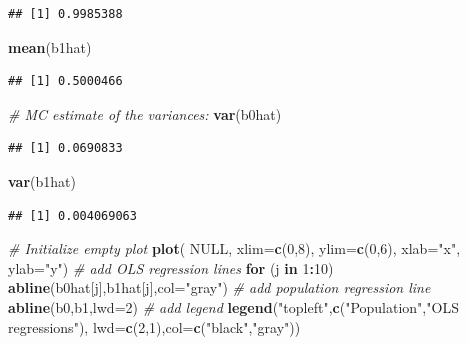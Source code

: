 \documentclass[]{book}
\newenvironment{Shaded}{\begin{snugshade}}{\end{snugshade}}
\newcommand{\CommentTok}[1]{\textcolor[rgb]{0.56,0.35,0.01}{\textit{#1}}}
\newcommand{\ControlFlowTok}[1]{\textcolor[rgb]{0.13,0.29,0.53}{\textbf{#1}}}
\newcommand{\DataTypeTok}[1]{\textcolor[rgb]{0.13,0.29,0.53}{#1}}
\newcommand{\DecValTok}[1]{\textcolor[rgb]{0.00,0.00,0.81}{#1}}
\newcommand{\KeywordTok}[1]{\textcolor[rgb]{0.13,0.29,0.53}{\textbf{#1}}}
\newcommand{\NormalTok}[1]{#1}
\newcommand{\OperatorTok}[1]{\textcolor[rgb]{0.81,0.36,0.00}{\textbf{#1}}}
\newcommand{\OtherTok}[1]{\textcolor[rgb]{0.56,0.35,0.01}{#1}}
\newcommand{\StringTok}[1]{\textcolor[rgb]{0.31,0.60,0.02}{#1}}
\begin{document}
\begin{verbatim}
## [1] 0.9985388
\end{verbatim}

\begin{Shaded}
\begin{Highlighting}[]
\KeywordTok{mean}\NormalTok{(b1hat)}
\end{Highlighting}
\end{Shaded}

\begin{verbatim}
## [1] 0.5000466
\end{verbatim}

\begin{Shaded}
\begin{Highlighting}[]
\CommentTok{# MC estimate of the variances:}
\KeywordTok{var}\NormalTok{(b0hat)}
\end{Highlighting}
\end{Shaded}

\begin{verbatim}
## [1] 0.0690833
\end{verbatim}

\begin{Shaded}
\begin{Highlighting}[]
\KeywordTok{var}\NormalTok{(b1hat)}
\end{Highlighting}
\end{Shaded}

\begin{verbatim}
## [1] 0.004069063
\end{verbatim}

\begin{Shaded}
\begin{Highlighting}[]
\CommentTok{# Initialize empty plot}
\KeywordTok{plot}\NormalTok{( }\OtherTok{NULL}\NormalTok{, }\DataTypeTok{xlim=}\KeywordTok{c}\NormalTok{(}\DecValTok{0}\NormalTok{,}\DecValTok{8}\NormalTok{), }\DataTypeTok{ylim=}\KeywordTok{c}\NormalTok{(}\DecValTok{0}\NormalTok{,}\DecValTok{6}\NormalTok{), }\DataTypeTok{xlab=}\StringTok{"x"}\NormalTok{, }\DataTypeTok{ylab=}\StringTok{"y"}\NormalTok{)}
\CommentTok{# add OLS regression lines}
\ControlFlowTok{for}\NormalTok{ (j }\ControlFlowTok{in} \DecValTok{1}\OperatorTok{:}\DecValTok{10}\NormalTok{) }\KeywordTok{abline}\NormalTok{(b0hat[j],b1hat[j],}\DataTypeTok{col=}\StringTok{"gray"}\NormalTok{)}
\CommentTok{# add population regression line}
\KeywordTok{abline}\NormalTok{(b0,b1,}\DataTypeTok{lwd=}\DecValTok{2}\NormalTok{)}
\CommentTok{# add legend}
\KeywordTok{legend}\NormalTok{(}\StringTok{"topleft"}\NormalTok{,}\KeywordTok{c}\NormalTok{(}\StringTok{"Population"}\NormalTok{,}\StringTok{"OLS regressions"}\NormalTok{),}
       \DataTypeTok{lwd=}\KeywordTok{c}\NormalTok{(}\DecValTok{2}\NormalTok{,}\DecValTok{1}\NormalTok{),}\DataTypeTok{col=}\KeywordTok{c}\NormalTok{(}\StringTok{"black"}\NormalTok{,}\StringTok{"gray"}\NormalTok{))}
\end{Highlighting}
\end{Shaded}
\end{document}
